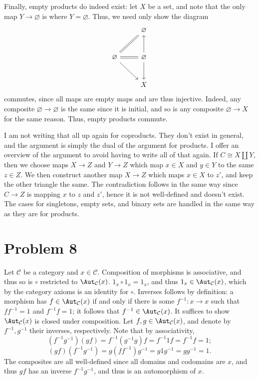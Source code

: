 \documentclass[11pt, letterpaper]{article}
\begin{document}
\begin{enumerate}
		Finally, empty products do indeed exist: let $X$ be a set, and note that the only map $Y\to \varnothing $ is where $Y=\varnothing $. Thus, we need only show the diagram
		\[\begin{tikzcd}[row sep = 2.5em, column sep = 2.5em]
		 & \varnothing  \\
		\varnothing \ar[equals, r] \ar[equals, ur] \ar[dr]  & \varnothing \ar[u] \ar[d]  \\
		 & X
		\end{tikzcd}\]
		commutes, since all maps are empty maps and are thus injective. Indeed, any composite $\varnothing \to \varnothing $ is the same since it is initial, and so is any composite $\varnothing \to X$ for the same reason. Thus, empty products commute.

		I am not writing that all up again for coproducts. They don't exist in general, and the argument is simply the dual of the argument for products. I offer an overview of the argument to avoid having to write all of that again. If $C\cong X\amalg Y$, then we choose maps $X\to Z$ and $Y\to Z$ which map $x\in X$ and $y\in Y$ to the same $z\in Z$. We then construct another map $X\to Z$ which maps $x\in X$ to $z'$, and keep the other triangle the same. The contradiction follows in the same way since $C\to Z$ is mapping $x$ to $z$ and $z'$, hence it is not well-defined and doesn't exist. The cases for singletons, empty sets, and binary sets are handled in the same way as they are for products.
\end{enumerate}

\section{Problem 8}

Let $\mathcal{C} $ be a category and $x\in \mathcal{C} $. Composition of morphisms is associative, and thus so is $\circ $ restricted to $\Aut_{\mathcal{C} }(x) $. $1_x\circ 1_x=1_x$, and thus $1_x\in \Aut_{\mathcal{C} }(x) $, which by the category axioms is an identity for $\circ $. Inverses follows by definition: a morphism has $f\in \Aut_{\mathcal{C} }(x) $ if and only if there is some $f^{-1} : x \to x$ such that $ff^{-1} =1$ and $f^{-1} f=1$; it follows that $f^{-1} \in \Aut_{\mathcal{C} }(x) $. It suffices to show $\Aut_{\mathcal{C} }(x) $ is closed under composition. Let $f,g\in\Aut_{\mathcal{C} }(x) $, and denote by $f^{-1} ,g^{-1} $ their inverses, respectively. Note that by associativity,
\[
	(f^{-1} g^{-1} )(gf)=f^{-1} (g^{-1} g)f=f^{-1} 1f=f^{-1} f=1
;\]
\[
	(gf)(f^{-1} g^{-1} )=g(ff^{-1} )g^{-1} =g1g^{-1} =gg^{-1} =1
.\]
The composites are all well-defined since all domains and codomains are $x$, and thus $gf$ has an inverse $f^{-1} g^{-1} $, and thus is an automorphism of $x$.
\end{document}
